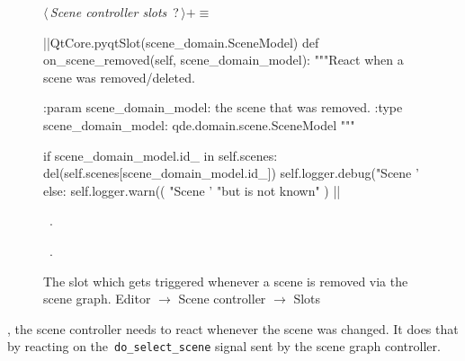 \documentclass[%
    a4paper,    %
    justified,  %
    nobib,      %
    openany     %
]{tufte-book}
\makeatletter
\renewcommand{\label}[1]{\@tufte@label{##1}}%
\makeatother
\begin{document}
\begin{figure}
\begin{flushleft} \small
\begin{minipage}{\linewidth}\label{scrap94}\raggedright\small
{} $\langle\,${\itshape Scene controller slots}\nobreak\ {\footnotesize {?}}$\,\rangle+\equiv$
\vspace{-1ex}
\begin{pythoncode}
|\normalfont{}\fontfamily{}|QtCore.pyqtSlot(scene_domain.SceneModel)
def on_scene_removed(self, scene_domain_model):
    """React when a scene was removed/deleted.

    :param scene_domain_model: the scene that was removed.
    :type scene_domain_model:  qde.domain.scene.SceneModel
    """

    if scene_domain_model.id_ in self.scenes:
        del(self.scenes[scene_domain_model.id_])
        self.logger.debug("Scene '%
    else:
        self.logger.warn((
            "Scene '%
            "but is not known"
        ) %
|\NWsep|
\end{pythoncode}
\vspace{1.5ex}
\footnotesize
\begin{list}{}{\setlength{\itemsep}{-\parsep}\setlength{\itemindent}{-\leftmargin}}
\item \NWtxtMacroDefBy\ .
\item \NWtxtMacroRefIn\ .

\item{}
\end{list}
\end{minipage}\vspace{4ex}
\end{flushleft}
\caption{The slot which gets triggered whenever a scene is removed via the
  scene graph.
  \newline{}\newline{}Editor $\rightarrow$ Scene controller $\rightarrow$
  Slots}
\label{editor:lst:scene-controller:slots:on-scene-removed}
\end{figure}

, the scene controller needs to react
whenever the scene was changed. It does that by reacting on
the~\verb=do_select_scene= signal sent by the scene graph controller.
\end{document}
